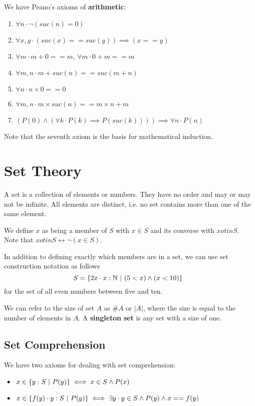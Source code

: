 \documentclass[12pt]{article}
\begin{document}
We have Peano's axioms of {\bf arithmetic}:
\begin{enumerate}
\item $\forall n \cdot \neg (suc(n) = 0)$
\item $\forall x, y \cdot (suc(x) == suc(y)) \implies (x == y)$
\item $\forall m \cdot m + 0 == m$, $\forall m \cdot 0 + m == m$
\item $\forall m,n \cdot m + suc(n) == suc(m + n)$
\item $\forall n \cdot n \times 0 == 0$
\item $\forall m,n \cdot m \times suc(n) == m \times n + m$
\item $(P(0) \land (\forall k \cdot P(k) \implies P(suc(k)))) \implies \forall n \cdot P(n)$
\end{enumerate}

Note that the seventh axiom is the basis for mathematical induction.

\section*{Set Theory}
A set is a collection of elements or numbers. They have no order and may or may not be infinite. All elements are distinct, i.e. no set contains more than one of the same element.

We define $x$ as being a member of $S$ with $x \in S$ and its converse with $x
otin S$. Note that $x
otin S \leftrightarrow \neg(x \in S)$.

In addition to defining exactly which members are in a set, we can use set construction notation as follows \[ S = \{ 2x \cdot x : \mathbb{N} \ |\  (5 < x) \land (x < 10) \} \] for the set of all even numbers between five and ten.

We can refer to the size of set $A$ as $\#A$ or $|A|$, where the size is equal to the number of elements in $A$. A {\bf singleton set} is any set with a size of one.

\subsection*{Set Comprehension}
We have two axioms for dealing with set comprehension:
\begin{itemize}
\item $x \in \{ y : S \ |\  P(y) \} \iff x \in S \land P(x)$
\item $x \in \{ f(y) \cdot y : S \ |\  P(y) \} \iff \exists y \cdot y \in S \land P(y) \land x == f(y)$
\end{itemize}
\end{document}
